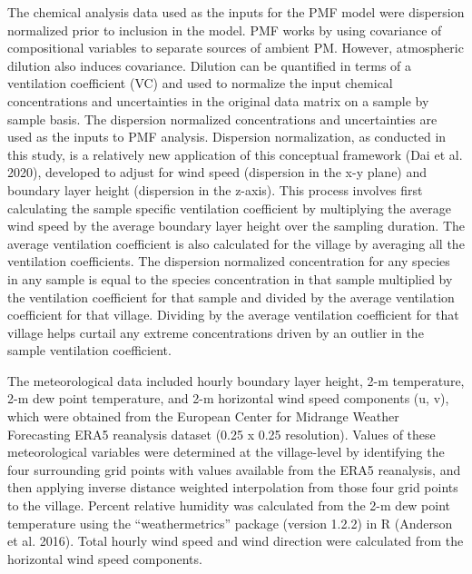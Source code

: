 \documentclass[
  letterpaper,
  DIV=11,
  numbers=noendperiod]{scrartcl}
\begin{document}
The chemical analysis data used as the inputs for the PMF model were
dispersion normalized prior to inclusion in the model. PMF works by
using covariance of compositional variables to separate sources of
ambient PM. However, atmospheric dilution also induces covariance.
Dilution can be quantified in terms of a ventilation coefficient (VC)
and used to normalize the input chemical concentrations and
uncertainties in the original data matrix on a sample by sample basis.
The dispersion normalized concentrations and uncertainties are used as
the inputs to PMF analysis. Dispersion normalization, as conducted in
this study, is a relatively new application of this conceptual framework
(Dai et al. 2020), developed to adjust for wind speed (dispersion in the
x-y plane) and boundary layer height (dispersion in the z-axis). This
process involves first calculating the sample specific ventilation
coefficient by multiplying the average wind speed by the average
boundary layer height over the sampling duration. The average
ventilation coefficient is also calculated for the village by averaging
all the ventilation coefficients. The dispersion normalized
concentration for any species in any sample is equal to the species
concentration in that sample multiplied by the ventilation coefficient
for that sample and divided by the average ventilation coefficient for
that village. Dividing by the average ventilation coefficient for that
village helps curtail any extreme concentrations driven by an outlier in
the sample ventilation coefficient.

The meteorological data included hourly boundary layer height, 2-m
temperature, 2-m dew point temperature, and 2-m horizontal wind speed
components (u, v), which were obtained from the European Center for
Midrange Weather Forecasting ERA5 reanalysis dataset (0.25 x 0.25
resolution). Values of these meteorological variables were determined at
the village-level by identifying the four surrounding grid points with
values available from the ERA5 reanalysis, and then applying inverse
distance weighted interpolation from those four grid points to the
village. Percent relative humidity was calculated from the 2-m dew point
temperature using the ``weathermetrics'' package (version 1.2.2) in R
(Anderson et al. 2016). Total hourly wind speed and wind direction were
calculated from the horizontal wind speed components.
\end{document}
